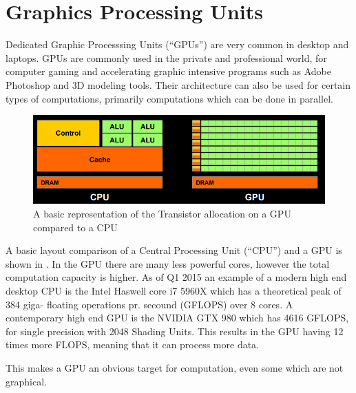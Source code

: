 \section{Graphics Processing Units}
Dedicated Graphic Processsing Units (``GPUs'') are very common in desktop and laptops. \citep{STEAMHW}
GPUs are commonly used in the private and professional world, for computer gaming and accelerating graphic intensive programs such as Adobe Photoshop and 3D modeling tools. \citep{NVIDIAADOBE}
Their architecture can also be used for certain types of computations, primarily computations which can be done in parallel. 

\begin{figure}[h!]
\centering
 \includegraphics[width=1\textwidth]{figures/GPUCPUimage.png} %
\caption{A basic representation of the Transistor allocation on a GPU compared to a CPU}\label{image:GPUCPUimage} %
\vspace{-15pt}
\end{figure}

A basic layout comparison of a Central Processing Unit (``CPU'') and a GPU is shown in .
In the GPU there are many less powerful cores, however the total computation capacity is higher. 
As of Q1 2015 an example of a modern high end desktop CPU is the Intel Haswell core i7 5960X which has a theoretical peak of 384 giga- floating operations pr. secound (GFLOPS) over 8 cores. \citep{puget}
A contemporary high end GPU is the NVIDIA GTX 980 which has 4616 GFLOPS, for single precision with 2048 Shading Units. \citep{techpowerup}
This results in the GPU having 12 times more FLOPS, meaning that it can process more data. 

This makes a GPU an obvious target for computation, even some which are not graphical. %